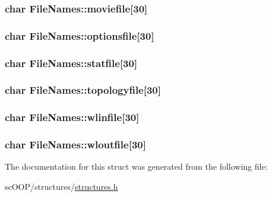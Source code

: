 \hypertarget{struct_file_names_ab6920a417c86a04aa771c248f75c6bf9}{
\subsubsection[{moviefile}]{\setlength{\rightskip}{0pt plus 5cm}char File\+Names\+::moviefile\mbox{[}30\mbox{]}}}\label{struct_file_names_ab6920a417c86a04aa771c248f75c6bf9}
\hypertarget{struct_file_names_aef0ce496bdcc9b924a111438a1e16573}{
\subsubsection[{optionsfile}]{\setlength{\rightskip}{0pt plus 5cm}char File\+Names\+::optionsfile\mbox{[}30\mbox{]}}}\label{struct_file_names_aef0ce496bdcc9b924a111438a1e16573}
\hypertarget{struct_file_names_a571bce947227b34ce9056cbff89c02b3}{
\subsubsection[{statfile}]{\setlength{\rightskip}{0pt plus 5cm}char File\+Names\+::statfile\mbox{[}30\mbox{]}}}\label{struct_file_names_a571bce947227b34ce9056cbff89c02b3}
\hypertarget{struct_file_names_a5d57cf5a04876391b131a9c9307bc7d5}{
\subsubsection[{topologyfile}]{\setlength{\rightskip}{0pt plus 5cm}char File\+Names\+::topologyfile\mbox{[}30\mbox{]}}}\label{struct_file_names_a5d57cf5a04876391b131a9c9307bc7d5}
\hypertarget{struct_file_names_af41fd595b79047dfee97d3a66aa7ef40}{
\subsubsection[{wlinfile}]{\setlength{\rightskip}{0pt plus 5cm}char File\+Names\+::wlinfile\mbox{[}30\mbox{]}}}\label{struct_file_names_af41fd595b79047dfee97d3a66aa7ef40}
\hypertarget{struct_file_names_ad3186b4b1d3a03d1cce61385475df1a9}{
\subsubsection[{wloutfile}]{\setlength{\rightskip}{0pt plus 5cm}char File\+Names\+::wloutfile\mbox{[}30\mbox{]}}}\label{struct_file_names_ad3186b4b1d3a03d1cce61385475df1a9}


The documentation for this struct was generated from the following file\+:\begin{DoxyCompactItemize}
\item 
sc\+O\+O\+P/structures/\hyperlink{structures_8h}{structures.\+h}\end{DoxyCompactItemize}
